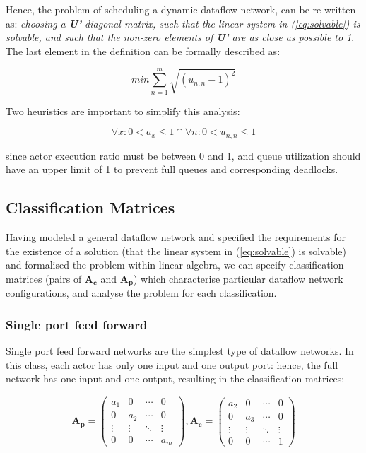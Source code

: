 Hence, the problem of scheduling a dynamic dataflow network, can be re-written as: \textit{choosing a \textbf{U'} diagonal matrix, such that the linear system in (\ref{eq:solvable}) is solvable, and such that the non-zero elements of \textbf{U'} are as close as possible to 1}. The last element in the definition can be formally described as:

\begin{equation}
min \sum_{n=1}^{m}{\sqrt{(u_{n,n}-1)^2}}
\end{equation} 

Two heuristics are important to simplify this analysis: 

\begin{equation}
\forall x: 0 < a_x \leq 1 \cap \forall n: 0 < u_{n,n} \leq 1
\end{equation} 


since actor execution ratio must be between 0 and 1, and queue utilization should have an upper limit of 1 to prevent full queues and corresponding deadlocks.


\subsection{Classification Matrices}

Having modeled a general dataflow network and specified the requirements for the existence of a solution (that the linear system in (\ref{eq:solvable}) is solvable) and formalised the problem within linear algebra, we can specify classification matrices (pairs of $\textbf{A}_{\textbf{c}}$ and $\textbf{A}_{\textbf{p}}$) which characterise particular dataflow network configurations, and analyse the problem for each classification.

\subsubsection{Single port feed forward}

Single port feed forward networks are the simplest type of dataflow networks. In this class, each actor has only one input and one output port: hence, the full network has one input and one output, resulting in the classification matrices:

\begin{equation}
\textbf{A}_{\textbf{p}}=
\begin{pmatrix}
   a_{1} & 0& \cdots & 0 \\
   0 & a_{2} & \cdots & 0 \\
   \vdots  & \vdots & \ddots & \vdots  \\
   0 & 0& \cdots & a_{m} 
 \end{pmatrix}
,
\textbf{A}_{\textbf{c}}=
\begin{pmatrix}
   a_{2} & 0& \cdots & 0 \\
   0 & a_{3} & \cdots & 0 \\
   \vdots  & \vdots & \ddots & \vdots  \\
   0 & 0& \cdots & 1 
 \end{pmatrix}
\end{equation} 

